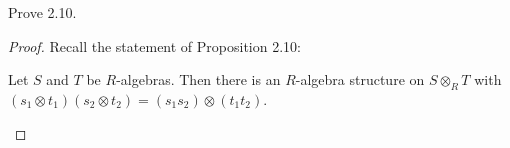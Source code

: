 \newpage
\begin{problem}
Prove 2.10.
\end{problem}
\begin{proof}
Recall the statement of Proposition 2.10:
\begin{proposition*}
Let $S$ and $T$ be $R$-algebras. Then there is an $R$-algebra
structure on $S\otimes_R T$ with $(s_1\otimes t_1)(s_2\otimes
t_2)=(s_1s_2)\otimes (t_1t_2)$.
\end{proposition*}
\end{proof}

